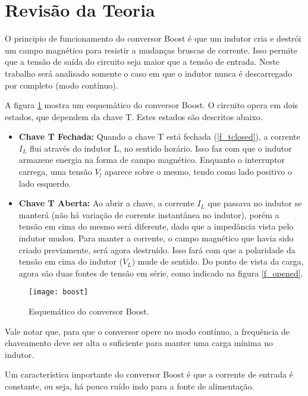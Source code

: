\newpage
\section{Revisão da Teoria}

O principio de funcionamento do conversor Boost é que um indutor cria e destrói um campo magnético para resistir a mudanças bruscas de corrente. Isso permite que a tensão de saída do circuito seja maior que a tensão de entrada. Neste trabalho será analisado somente o caso em que o indutor nunca é descarregado por completo (modo contínuo).

A figura \ref{f_boost} mostra um esquemático do conversor Boost. O circuito opera em dois estados, que dependem da chave T. Estes estados são descritos abaixo.

\begin{itemize}
    \item \textbf{Chave T Fechada:} Quando a chave T está fechada (\ref{f_tclosed}), a corrente $I_L$ flui através do indutor L, no sentido horário. Isso faz com que o indutor armazene energia na forma de campo magnético. Enquanto o interruptor carrega, uma tensão $V_l$ aparece sobre o mesmo, tendo como lado positivo o lado esquerdo.
    
    \item \textbf{Chave T Aberta:} Ao abrir a chave, a corrente $I_L$ que passava no indutor se manterá (não há variação de corrente instantânea no indutor), porém a tensão em cima do mesmo será diferente, dado que a impedância vista pelo indutor mudou. Para manter a corrente, o campo magnético que havia sido criado previamente, será agora destruído. Isso fará com que a polaridade da tensão em cima do indutor ($V_L$) mude de sentido. Do ponto de vista da carga, agora são duas fontes de tensão em série, como indicado na figura \ref{f_opened}.
\end{itemize}


\begin{figure}[H]
    \centering
    \caption{Esquemático do conversor Boost.}
    \texttt{[image: boost]}
    \label{f_boost}
\end{figure}

Vale notar que, para que o conversor opere no modo contínuo, a frequência de chaveamento deve ser alta o suficiente para manter uma carga mínima no indutor.

Um característica importante do conversor Boost é que a corrente de entrada é constante, ou seja, há pouco ruído indo para a fonte de alimentação.

